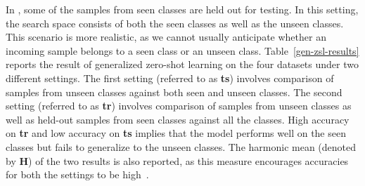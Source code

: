 \documentclass[10pt,twocolumn,letterpaper]{article}
\begin{document}
In \cite{Xian_2017_CVPR}, some of the samples from seen classes are held out for testing. In this setting, the search space consists of both the seen classes as well as the unseen classes. This scenario is more realistic, as we cannot usually anticipate whether an incoming sample belongs to a seen class or an unseen class. Table~\ref{gen-zsl-results} reports the result of generalized zero-shot learning on the four datasets under two different settings. 
The first setting (referred to as \textbf{ts}) involves comparison of samples from unseen classes against both seen and unseen classes. %
The second setting (referred to as \textbf{tr}) involves comparison of samples from unseen classes as well as held-out samples from seen classes against all the classes. High accuracy on \textbf{tr} and low accuracy on \textbf{ts} implies that the model performs well on the seen classes but fails to generalize to the unseen classes. 
The harmonic mean (denoted by \textbf{H}) of the two results is also reported, as this measure encourages accuracies for both the settings to be high~\cite{Xian_2017_CVPR,xian2017zero1}.
\end{document}
